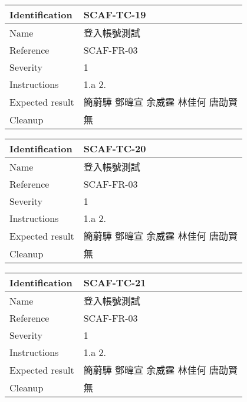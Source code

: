 \documentclass{report}
\begin{document}
\begin{tabularx}{0.9\textwidth}{
  |p{}%
  |p{}|%
  }
  \hline
  \centering Identification &  SCAF-TC-19 \\
  \hline
  \centering Name & 登入帳號測試 \\
  \hline
  \centering Reference & SCAF-FR-03 \\
  \hline
  \centering Severity & 1 \\
  \hline
  \centering Instructions & 1.a
                            2. \\
  \hline
  \centering Expected result & 簡蔚驊 \! 鄧暐宣 \! 余威霆 \! 林佳何 \! 唐劭賢 \\
  \hline
  \centering Cleanup & 無 \\
  \hline
\end{tabularx}
\newline\newline

\begin{tabularx}{0.9\textwidth}{
  |p{}%
  |p{}|%
  }
  \hline
  \centering Identification &  SCAF-TC-20 \\
  \hline
  \centering Name & 登入帳號測試 \\
  \hline
  \centering Reference & SCAF-FR-03 \\
  \hline
  \centering Severity & 1 \\
  \hline
  \centering Instructions & 1.a
                            2. \\
  \hline
  \centering Expected result & 簡蔚驊 \! 鄧暐宣 \! 余威霆 \! 林佳何 \! 唐劭賢 \\
  \hline
  \centering Cleanup & 無 \\
  \hline
\end{tabularx}
\newline\newline

\begin{tabularx}{0.9\textwidth}{
  |p{}%
  |p{}|%
  }
  \hline
  \centering Identification &  SCAF-TC-21 \\
  \hline
  \centering Name & 登入帳號測試 \\
  \hline
  \centering Reference & SCAF-FR-03 \\
  \hline
  \centering Severity & 1 \\
  \hline
  \centering Instructions & 1.a
                            2. \\
  \hline
  \centering Expected result & 簡蔚驊 \! 鄧暐宣 \! 余威霆 \! 林佳何 \! 唐劭賢 \\
  \hline
  \centering Cleanup & 無 \\
  \hline
\end{tabularx}
\newline\newline
\end{document}
